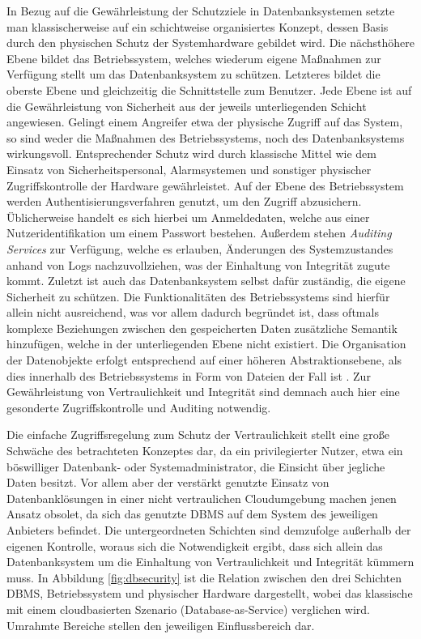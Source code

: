 In Bezug auf die Gewährleistung der Schutzziele in Datenbanksystemen setzte man klassischerweise auf ein schichtweise organisiertes Konzept, dessen Basis durch den physischen Schutz der Systemhardware gebildet wird. Die nächsthöhere Ebene bildet das Betriebssystem, welches wiederum eigene Maßnahmen zur Verfügung stellt um das Datenbanksystem zu schützen. Letzteres bildet die oberste Ebene und gleichzeitig die Schnittstelle zum Benutzer. Jede Ebene ist auf die Gewährleistung von Sicherheit aus der jeweils unterliegenden Schicht angewiesen. Gelingt einem Angreifer etwa der physische Zugriff auf das System, so sind weder die Maßnahmen des Betriebssystems, noch des Datenbanksystems wirkungsvoll. Entsprechender Schutz wird durch klassische Mittel wie dem Einsatz von Sicherheitspersonal, Alarmsystemen und sonstiger physischer Zugriffskontrolle der Hardware gewährleistet. Auf der Ebene des Betriebssystem werden Authentisierungsverfahren genutzt, um den Zugriff abzusichern. Üblicherweise handelt es sich hierbei um Anmeldedaten, welche aus einer Nutzeridentifikation um einem Passwort bestehen. Außerdem stehen \textit{Auditing Services} zur Verfügung, welche es erlauben, Änderungen des Systemzustandes anhand von Logs nachzuvollziehen, was der Einhaltung von Integrität zugute kommt. Zuletzt ist auch das Datenbanksystem selbst dafür zuständig, die eigene Sicherheit zu schützen. Die Funktionalitäten des Betriebssystems sind hierfür allein nicht ausreichend, was vor allem dadurch begründet ist, dass oftmals komplexe Beziehungen zwischen den gespeicherten Daten zusätzliche Semantik hinzufügen, welche in der unterliegenden Ebene nicht existiert. Die Organisation der Datenobjekte erfolgt entsprechend auf einer höheren Abstraktionsebene, als dies innerhalb des Betriebssystems in Form von Dateien der Fall ist \cite{Vimercati2001}. Zur Gewährleistung von Vertraulichkeit und Integrität sind demnach auch hier eine gesonderte Zugriffskontrolle und Auditing notwendig.

Die einfache Zugriffsregelung zum Schutz der Vertraulichkeit stellt eine große Schwäche des betrachteten Konzeptes dar, da ein privilegierter Nutzer, etwa ein böswilliger Datenbank- oder Systemadministrator, die Einsicht über jegliche Daten besitzt. Vor allem aber der verstärkt genutzte Einsatz von Datenbanklösungen in einer nicht vertraulichen Cloudumgebung machen jenen Ansatz obsolet, da sich das genutzte DBMS auf dem System des jeweiligen Anbieters befindet. Die untergeordneten Schichten sind demzufolge außerhalb der eigenen Kontrolle, woraus sich die Notwendigkeit ergibt, dass sich allein das Datenbanksystem um die Einhaltung von Vertraulichkeit und Integrität kümmern muss. In Abbildung \ref{fig:dbsecurity} ist die Relation zwischen den drei Schichten DBMS, Betriebssystem und physischer Hardware dargestellt, wobei das klassische mit einem cloudbasierten Szenario (Database-as-Service) verglichen wird. Umrahmte Bereiche stellen den jeweiligen Einflussbereich dar.

